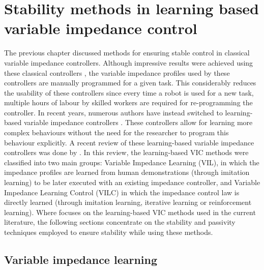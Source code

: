 \chapter{Stability methods in learning based variable impedance control}
\label{chapter:learning_based_variable_impedance}


The previous chapter discussed methods for ensuring stable control in classical variable impedance controllers. Although impressive results were achieved using these classical controllers \cite{songTutorialSurveyComparison2019}, the variable impedance profiles used by these controllers are manually programmed for a given task. This considerably reduces the usability of these controllers since every time a robot is used for a new task, multiple hours of labour by skilled workers are required for re-programming the controller. In recent years, numerous authors have instead switched to learning-based variable impedance controllers \cite{abu-dakkaVariableImpedanceControl2020}. These controllers allow for learning more complex behaviours without the need for the researcher to program this behaviour explicitly. A recent review of these learning-based variable impedance controllers was done by \cite{abu-dakkaVariableImpedanceControl2020}. In this review, the learning-based VIC methods were classified into two main groups: Variable Impedance Learning (VIL), in which the impedance profiles are learned from human demonstrations (through imitation learning) to be later executed with an existing impedance controller, and Variable Impedance Learning Control (VILC) in which the impedance control law is directly learned (through imitation learning, iterative learning or reinforcement learning). Where \cite{abu-dakkaVariableImpedanceControl2020} focuses on the learning-based VIC methods used in the current literature, the following sections concentrate on the stability and passivity techniques employed to ensure stability while using these methods.

\section{Variable impedance learning}

